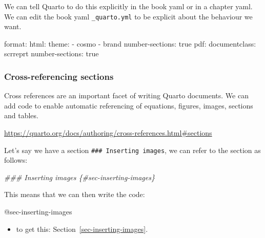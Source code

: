 \documentclass[
  letterpaper,
  DIV=11,
  numbers=noendperiod]{scrreprt}
\newenvironment{Shaded}{\begin{snugshade}}{\end{snugshade}}
\newcommand{\DocumentationTok}[1]{\textcolor[rgb]{0.37,0.37,0.37}{\textit{#1}}}
\newcommand{\NormalTok}[1]{\textcolor[rgb]{0.00,0.23,0.31}{#1}}
\newcommand{\SpecialCharTok}[1]{\textcolor[rgb]{0.37,0.37,0.37}{#1}}
\providecommand{\tightlist}{%
  \setlength{\itemsep}{0pt}\setlength{\parskip}{0pt}}
\begin{document}
We can tell Quarto to do this explicitly in the book yaml or in a
chapter yaml. We can edit the book yaml \texttt{\_quarto.yml} to be
explicit about the behaviour we want.

\begin{Shaded}
\begin{Highlighting}[]
\NormalTok{format}\SpecialCharTok{:}
\NormalTok{  html}\SpecialCharTok{:}
\NormalTok{    theme}\SpecialCharTok{:}
      \SpecialCharTok{{-}}\NormalTok{ cosmo}
      \SpecialCharTok{{-}}\NormalTok{ brand}
\NormalTok{    number}\SpecialCharTok{{-}}\NormalTok{sections}\SpecialCharTok{:}\NormalTok{ true  }
\NormalTok{  pdf}\SpecialCharTok{:}
\NormalTok{    documentclass}\SpecialCharTok{:}\NormalTok{ scrreprt}
\NormalTok{    number}\SpecialCharTok{{-}}\NormalTok{sections}\SpecialCharTok{:}\NormalTok{ true}
\end{Highlighting}
\end{Shaded}

\subsubsection{Cross-referencing
sections}\label{cross-referencing-sections}

Cross references are an important facet of writing Quarto documents. We
can add code to enable automatic referencing of equations, figures,
images, sections and tables.

\url{https://quarto.org/docs/authoring/cross-references.html\#sections}

Let's say we have a section \texttt{\#\#\#\ Inserting\ images}, we can
refer to the section as follows:

\begin{Shaded}
\begin{Highlighting}[]
\DocumentationTok{\#\#\# Inserting images \{\#sec{-}inserting{-}images\}}
\end{Highlighting}
\end{Shaded}

This means that we can then write the code:

\begin{Shaded}
\begin{Highlighting}[]
\SpecialCharTok{@}\NormalTok{sec}\SpecialCharTok{{-}}\NormalTok{inserting}\SpecialCharTok{{-}}\NormalTok{images}
\end{Highlighting}
\end{Shaded}

\begin{itemize}
\tightlist
\item
  to get this: Section~\ref{sec-inserting-images}.
\end{itemize}
\end{document}
